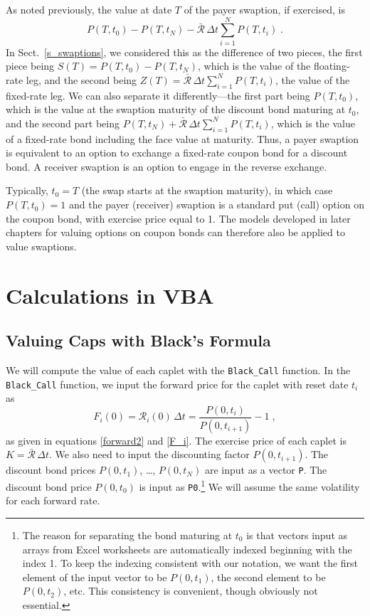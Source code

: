 As noted previously, the value at date $T$ of the payer swaption, if exercised, is
$$P(T,t_0)-P(T,t_N) - \bar{\mathcal{R}}\,\varDelta t\sum_{i=1}^N P(T,t_i)\; .$$
In Sect.~\ref{s_swaptions}, we considered this as the difference of two pieces, the first piece being $S(T) = P(T,t_0)-P(T,t_N)$, which is the value of the floating-rate leg, and the second being 
$Z(T) = \bar{\mathcal{R}}\,\varDelta t\sum_{i=1}^N P(T,t_i)$, the value of the fixed-rate leg.  We can also separate it differently---the first part being $P(T,t_0)$, which is the value at the swaption maturity of the discount bond maturing at $t_0$, and the second part being    $P(T,t_N)+\bar{\mathcal{R}}\,\varDelta t\sum_{i=1}^N P(T,t_i)$, which is the value of a fixed-rate bond including the face value at maturity.  Thus, a payer swaption is equivalent to an option to exchange a fixed-rate coupon bond for a discount bond.  A receiver  swaption is an option to engage in the reverse exchange. 

Typically, $t_0=T$ (the swap starts at the swaption maturity), in which case $P(T,t_0)=1$ and the payer (receiver) swaption is a standard put (call) option on the coupon bond, with exercise price equal to 1.  The models developed in later chapters for valuing options on coupon bonds can therefore also be applied to value swaptions. 


\section{Calculations in VBA}\label{s_fixedincomederivatives_matlab}

\subsection*{Valuing Caps with Black's Formula}

We will compute the value of each caplet with the \verb!Black_Call! function.
In the \verb!Black_Call! function, we input the forward price for the caplet with reset date $t_i$ as
\begin{equation}\label{capletforwardprice}
F_i(0) = \mathcal{R}_i(0)\,\varDelta t = \frac{P(0,t_i)}{P(0,t_{i+1})} - 1\;,
\end{equation}
as given in equations \eqref{forward2} and \eqref{F_i}.  The exercise price of each caplet is $K=\bar{\mathcal{R}}\,\varDelta t$.  We also need to input the discounting factor $P(0,t_{i+1})$.
The discount bond prices $P(0,t_1)$, \ldots, $P(0, t_N)$ are input as a vector \verb!P!.  The discount bond price $P(0,t_0)$ is input as \verb!P0!.\footnote{The reason for separating the bond maturing at $t_0$ is that vectors input as arrays from Excel worksheets are automatically indexed beginning with the index 1.  To keep the indexing consistent with our notation, we want the first element of the input vector to be $P(0,t_1)$, the second element to be $P(0,t_2)$, etc.  This consistency is convenient, though obviously not essential.}  We will assume the same volatility for each forward rate.


